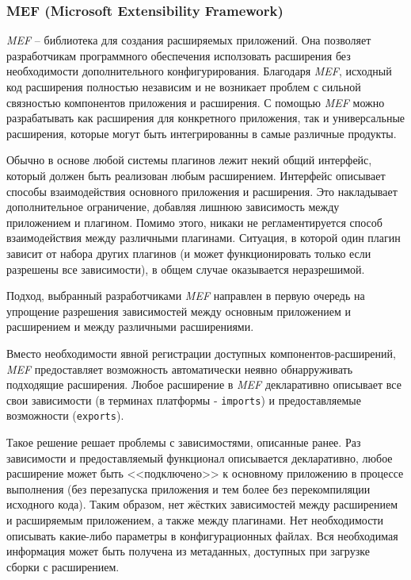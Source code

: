 \subsubsection{MEF (Microsoft Extensibility Framework)}

{\it MEF} -- библиотека для создания расширяемых приложений. Она позволяет разработчикам программного обеспечения исползовать расширения без необходимости дополнительного конфигурирования. Благодаря {\it MEF}, исходный код расширения полностью независим и не возникает проблем с сильной связностью компонентов приложения и расширения. С помощью {\it MEF} можно разрабатывать как расширения для конкретного приложения, так и универсальные расширения, которые могут быть интегрированны в самые различные продукты.

Обычно в основе любой системы плагинов лежит некий общий интерфейс, который должен быть реализован любым расширением. Интерфейс описывает способы взаимодействия основного приложения и расширения. Это накладывает дополнительное ограничение, добавляя лишнюю зависимость между приложением и плагином. Помимо этого, никаки не регламентируется способ взаимодействия между различными плагинами. Ситуация, в которой один плагин зависит от набора других плагинов (и может функционировать только если разрешены все зависимости), в общем случае оказывается неразрешимой.

Подход, выбранный разработчиками {\it MEF} направлен в первую очередь на упрощение разрешения зависимостей между основным приложением и расширением и между различными расширениями.

Вместо необходимости явной регистрации доступных компонентов-расширений, {\it MEF} предоставляет возможность автоматически неявно обнарруживать подходящие расширения. Любое расширение в {\it MEF} декларативно описывает все свои зависимости (в терминах платформы - {\tt imports}) и предоставляемые возможности ({\tt exports}).

Такое решение решает проблемы с зависимостями, описанные ранее. Раз зависимости и предоставляемый функционал описывается декларативно, любое расширение может быть <<подключено>> к основному приложению в процессе выполнения (без перезапуска приложения и тем более без перекомпиляции исходного кода). Таким образом, нет жёстких зависимостей между расширением и расширяемым приложением, а также между плагинами. Нет необходимости описывать какие-либо параметры в конфигурационных файлах. Вся необходимая информация может быть получена из метаданных, доступных при загрузке сборки с расширением.

